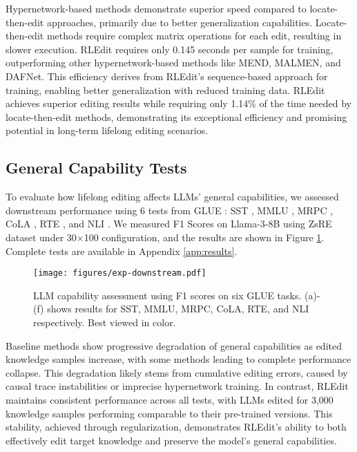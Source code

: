 Hypernetwork-based methods demonstrate superior speed compared to locate-then-edit approaches, primarily due to better generalization capabilities. Locate-then-edit methods require complex matrix operations for each edit, resulting in slower execution. RLEdit requires only 0.145 seconds per sample for training, outperforming other hypernetwork-based methods like MEND, MALMEN, and DAFNet. This efficiency derives from RLEdit's sequence-based approach for training, enabling better generalization with reduced training data. RLEdit achieves superior editing results while requiring only 1.14\% of the time needed by locate-then-edit methods, demonstrating its exceptional efficiency and promising potential in long-term lifelong editing scenarios.


\subsection{General Capability Tests}
\label{section:4.5}
To evaluate how lifelong editing affects LLMs' general capabilities, we assessed downstream performance using 6 tests from GLUE \cite{glue}: SST \cite{sst}, MMLU \cite{mmlu}, MRPC \cite{mrpc}, CoLA \cite{cola}, RTE \cite{rte}, and NLI \cite{nli}.  We measured F1 Scores on Llama-3-8B using ZsRE dataset under 30$\times$100 configuration, and the results are shown in Figure \ref{fig:downstream}. Complete tests are available in Appendix \ref{app:results}.

\begin{figure}
    \centering
    \texttt{[image: figures/exp-downstream.pdf]}
    \caption{LLM capability assessment using F1 scores on six GLUE tasks. (a)-(f) shows results for SST, MMLU, MRPC, CoLA, RTE, and NLI respectively. Best viewed in color.}
    \label{fig:downstream}
\end{figure}

Baseline methods show progressive degradation of general capabilities as edited knowledge samples increase, with some methods leading to complete performance collapse. This degradation likely stems from cumulative editing errors, caused by causal trace instabilities or imprecise hypernetwork training. In contrast, RLEdit maintains consistent performance across all tests, with LLMs edited for 3,000 knowledge samples performing comparable to their pre-trained versions. This stability, achieved through regularization, demonstrates RLEdit's ability to both effectively edit target knowledge and preserve the model's general capabilities.


